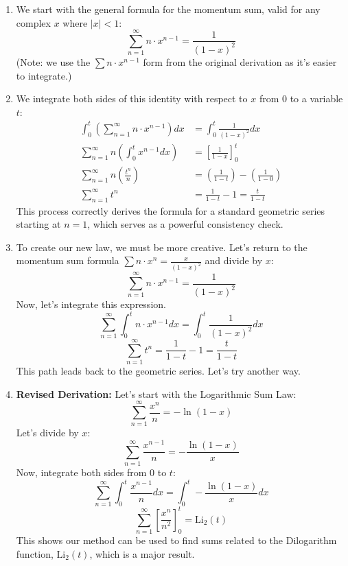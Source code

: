 \begin{enumerate}
    \item We start with the general formula for the momentum sum, valid for any complex $x$ where $|x|<1$:
    $$ \sum_{n=1}^{\infty} n \cdot x^{n-1} = \frac{1}{(1-x)^2} $$
    (Note: we use the $\sum n \cdot x^{n-1}$ form from the original derivation as it's easier to integrate.)

    \item We integrate both sides of this identity with respect to $x$ from $0$ to a variable $t$:
    \begin{align*}
        \int_0^t \left( \sum_{n=1}^{\infty} n \cdot x^{n-1} \right) dx &= \int_0^t \frac{1}{(1-x)^2} dx \\
        \sum_{n=1}^{\infty} n \left( \int_0^t x^{n-1} dx \right) &= \left[ \frac{1}{1-x} \right]_0^t \\
        \sum_{n=1}^{\infty} n \left( \frac{t^n}{n} \right) &= \left( \frac{1}{1-t} \right) - \left( \frac{1}{1-0} \right) \\
        \sum_{n=1}^{\infty} t^n &= \frac{1}{1-t} - 1 = \frac{t}{1-t}
    \end{align*}
    This process correctly derives the formula for a standard geometric series starting at $n=1$, which serves as a powerful consistency check.

    \item To create our new law, we must be more creative. Let's return to the momentum sum formula $\sum n \cdot x^n = \frac{x}{(1-x)^2}$ and divide by $x$:
    $$ \sum_{n=1}^{\infty} n \cdot x^{n-1} = \frac{1}{(1-x)^2} $$
    Now, let's integrate this expression.
    $$ \sum_{n=1}^{\infty} \int_0^t n \cdot x^{n-1} dx = \int_0^t \frac{1}{(1-x)^2} dx $$
    $$ \sum_{n=1}^{\infty} t^n = \frac{1}{1-t} - 1 = \frac{t}{1-t} $$
    This path leads back to the geometric series. Let's try another way.

    \item \textbf{Revised Derivation:} Let's start with the Logarithmic Sum Law:
    $$ \sum_{n=1}^{\infty} \frac{x^n}{n} = -\ln(1-x) $$
    Let's divide by $x$:
    $$ \sum_{n=1}^{\infty} \frac{x^{n-1}}{n} = -\frac{\ln(1-x)}{x} $$
    Now, integrate both sides from 0 to $t$:
    $$ \sum_{n=1}^{\infty} \int_0^t \frac{x^{n-1}}{n} dx = \int_0^t -\frac{\ln(1-x)}{x} dx $$
    $$ \sum_{n=1}^{\infty} \left[ \frac{x^n}{n^2} \right]_0^t = \text{Li}_2(t) $$
    This shows our method can be used to find sums related to the Dilogarithm function, $\text{Li}_2(t)$, which is a major result.


\end{enumerate}
